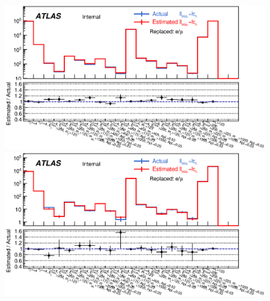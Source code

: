 \begin{figure}[htbp]
  \begin{center}
    \includegraphics[width=160mm]{figures/BGestimation/ObjReplacement/mcClosure_ATLASNote/All_emu/All_emu_regionYieldsBT__trMode4_NoSys.eps}
    \label{fig::BGestimation::objRep::mcClosure::MisLepTauRep_regionYieldsBT}
    \includegraphics[width=160mm]{figures/BGestimation/ObjReplacement/mcClosure_ATLASNote/All_emu/All_emu_regionYieldsBV__trMode4_NoSys.eps}
    \label{fig::BGestimation::objRep::mcClosure::MisLepTauRep_regionYieldsBV}
  \end{center}
\end{figure}

